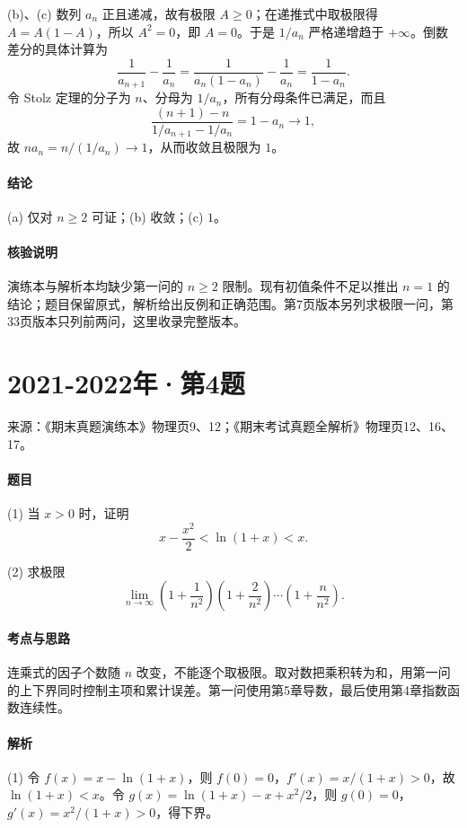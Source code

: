 \documentclass[UTF8,fontset=fandol,12pt,oneside,openany]{ctexrep}
\theoremstyle{definition}
\begin{document}
(b)、(c) 数列 $a_n$ 正且递减，故有极限 $A\ge0$；在递推式中取极限得 $A=A(1-A)$，所以 $A^2=0$，即 $A=0$。于是 $1/a_n$ 严格递增趋于 $+\infty$。倒数差分的具体计算为
\[
\frac1{a_{n+1}}-\frac1{a_n}
=\frac1{a_n(1-a_n)}-\frac1{a_n}
=\frac1{1-a_n}.
\]
令 Stolz 定理的分子为 $n$、分母为 $1/a_n$，所有分母条件已满足，而且
\[
\frac{(n+1)-n}{1/a_{n+1}-1/a_n}=1-a_n\to1,
\]故 $na_n=n/(1/a_n)\to1$，从而收敛且极限为 $1$。

\paragraph{结论}
(a) 仅对 $n\ge2$ 可证；(b) 收敛；(c) $1$。

\paragraph{核验说明}
演练本与解析本均缺少第一问的 $n\ge2$ 限制。现有初值条件不足以推出 $n=1$ 的结论；题目保留原式，解析给出反例和正确范围。第7页版本另列求极限一问，第33页版本只列前两问，这里收录完整版本。

\par\addvspace{18pt}\noindent\begin{minipage}{\linewidth}
\section{2021-2022年·第4题}
\label{exam:02:2021-2022-4}
\noindent 来源：《期末真题演练本》物理页9、12；《期末考试真题全解析》物理页12、16、17。

\paragraph{题目}
(1) 当 $x>0$ 时，证明 \[
x-\frac{x^2}{2}<\ln(1+x)<x.
\]

(2) 求极限 \[
\lim_{n\to\infty}\left(1+\frac1{n^2}\right)\left(1+\frac2{n^2}\right)\cdots\left(1+\frac n{n^2}\right).
\]
\end{minipage}\par
\paragraph{考点与思路}
连乘式的因子个数随 $n$ 改变，不能逐个取极限。取对数把乘积转为和，用第一问的上下界同时控制主项和累计误差。第一问使用第5章导数，最后使用第4章指数函数连续性。

\paragraph{解析}
(1) 令 $f(x)=x-\ln(1+x)$，则 $f(0)=0$，$f'(x)=x/(1+x)>0$，故 $\ln(1+x)<x$。令 $g(x)=\ln(1+x)-x+x^2/2$，则 $g(0)=0$，$g'(x)=x^2/(1+x)>0$，得下界。
\end{document}
